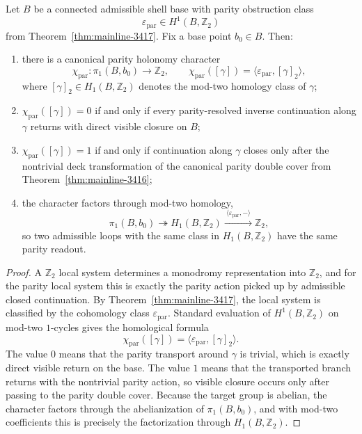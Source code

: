 \begin{theorem}
\label{thm:mainline-3418}
Let $B$ be a connected admissible shell base with parity obstruction class
\[
  \varepsilon_{\mathrm{par}}\in H^1(B,\mathbb Z_2)
\]
from Theorem~\ref{thm:mainline-3417}. Fix a base point $b_0\in B$. Then:
\begin{enumerate}[label=(\roman*)]
  \item there is a canonical parity holonomy character
  \[
    \chi_{\mathrm{par}}:\pi_1(B,b_0)\to \mathbb Z_2,
    \qquad
    \chi_{\mathrm{par}}([\gamma])=\langle \varepsilon_{\mathrm{par}},[\gamma]_{2}\rangle,
  \]
  where $[\gamma]_2\in H_1(B,\mathbb Z_2)$ denotes the mod-two homology class of $\gamma$;
  \item $\chi_{\mathrm{par}}([\gamma])=0$ if and only if every parity-resolved inverse continuation along $\gamma$ returns with direct visible closure on $B$;
  \item $\chi_{\mathrm{par}}([\gamma])=1$ if and only if continuation along $\gamma$ closes only after the nontrivial deck transformation of the canonical parity double cover from Theorem~\ref{thm:mainline-3416};
  \item the character factors through mod-two homology,
  \[
    \pi_1(B,b_0)\twoheadrightarrow H_1(B,\mathbb Z_2)\xrightarrow{\ \langle \varepsilon_{\mathrm{par}},-\rangle\ }\mathbb Z_2,
  \]
  so two admissible loops with the same class in $H_1(B,\mathbb Z_2)$ have the same parity readout.
\end{enumerate}
\end{theorem}

\begin{proof}
A $\mathbb Z_2$ local system determines a monodromy representation into $\mathbb Z_2$, and for the parity local system this is exactly the parity action picked up by admissible closed continuation. By Theorem~\ref{thm:mainline-3417}, the local system is classified by the cohomology class $\varepsilon_{\mathrm{par}}$. Standard evaluation of $H^1(B,\mathbb Z_2)$ on mod-two $1$-cycles gives the homological formula
\[
  \chi_{\mathrm{par}}([\gamma])=\langle \varepsilon_{\mathrm{par}},[\gamma]_2\rangle.
\]
The value $0$ means that the parity transport around $\gamma$ is trivial, which is exactly direct visible return on the base. The value $1$ means that the transported branch returns with the nontrivial parity action, so visible closure occurs only after passing to the parity double cover. Because the target group is abelian, the character factors through the abelianization of $\pi_1(B,b_0)$, and with mod-two coefficients this is precisely the factorization through $H_1(B,\mathbb Z_2)$.
\end{proof}

